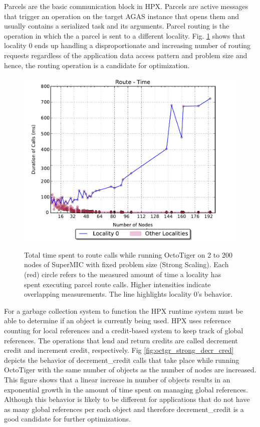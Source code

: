 Parcels are the basic communication block in HPX. Parcels are active messages
that trigger an operation on the target AGAS instance that opens them and
usually contains a serialized task and its arguments. Parcel routing is the
operation in which the a parcel is sent to a different locality. Fig.
\ref{fig:octgr_strong_route_time} shows that locality 0 ends up handling a
disproportionate and increasing number of routing requests regardless of the
application data access pattern and problem size and hence, the routing operation
is a candidate for optimization.

\begin{figure}[h]
    \centering
    \caption{Total time spent to route calls while running OctoTiger on 2 to 200 nodes of SuperMIC with fixed problem size (Strong Scaling). Each (red) circle refers to the measured amount of time a locality has spent executing parcel route calls. Higher intensities indicate overlapping measurements. The line highlights locality 0's behavior.}
    \includegraphics[width=.54\textwidth,height=\textheight,keepaspectratio]{graphs/octotiger_route_time}
    \label{fig:octgr_strong_route_time}
\end{figure}
For a garbage collection system to function the HPX runtime system must be able
to determine if an object is currently being used. HPX uses reference counting
for local references and a credit-based system to keep track of global
references. The operations that lend and return credits are called decrement
credit and increment credit, respectively.
Fig \ref{fig:octgr_strong_decr_cred} depicts the behavior of decrement\_credit
calls that take place while running OctoTiger with the same number of objects as
the number of nodes are increased. This figure shows that a
linear increase in number of objects results in an exponential growth
in the amount of time spent on managing global references. Although this
behavior is likely to be different for applications that do not have as many
global references per each object and therefore decrement\_credit is a good
candidate for further optimizations.

